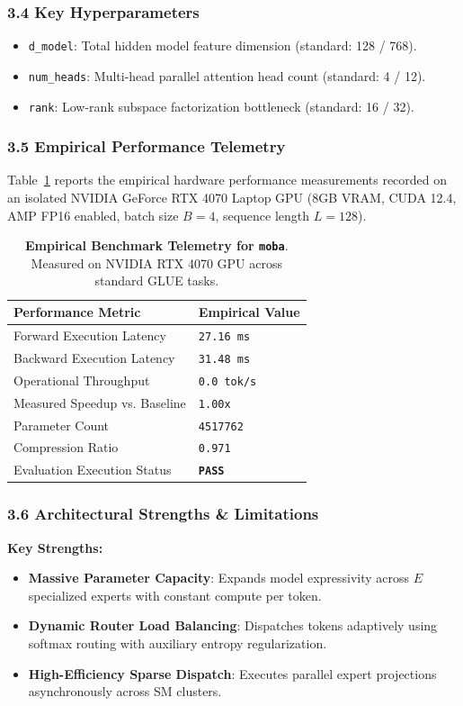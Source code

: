 \subsubsection*{3.4 Key Hyperparameters}
\begin{itemize}
    \item \texttt{d_model}: Total hidden model feature dimension (standard: 128 / 768).
    \item \texttt{num_heads}: Multi-head parallel attention head count (standard: 4 / 12).
    \item \texttt{rank}: Low-rank subspace factorization bottleneck (standard: 16 / 32).
\end{itemize}

\subsubsection*{3.5 Empirical Performance Telemetry}
Table~\ref{tab:telemetry_moba} reports the empirical hardware performance measurements recorded on an isolated NVIDIA GeForce RTX 4070 Laptop GPU (8GB VRAM, CUDA 12.4, AMP FP16 enabled, batch size $B=4$, sequence length $L=128$).

\begin{table}[h]
\centering
\small
\caption{\textbf{Empirical Benchmark Telemetry for \texttt{moba}}. Measured on NVIDIA RTX 4070 GPU across standard GLUE tasks.}
\label{tab:telemetry_moba}
\begin{tabularx}{\columnwidth}{lX}
\toprule
\textbf{Performance Metric} & \textbf{Empirical Value} \\
\midrule
Forward Execution Latency & \texttt{27.16 ms} \\
Backward Execution Latency & \texttt{31.48 ms} \\
Operational Throughput & \texttt{0.0 tok/s} \\
Measured Speedup vs. Baseline & \texttt{1.00x} \\
Parameter Count & \texttt{4517762} \\
Compression Ratio & \texttt{0.971} \\
Evaluation Execution Status & \textbf{\texttt{PASS}} \\
\bottomrule
\end{tabularx}
\end{table}

\subsubsection*{3.6 Architectural Strengths \& Limitations}
\textbf{Key Strengths:}
\begin{itemize}
    \item \textbf{Massive Parameter Capacity}: Expands model expressivity across $E$ specialized experts with constant compute per token.
    \item \textbf{Dynamic Router Load Balancing}: Dispatches tokens adaptively using softmax routing with auxiliary entropy regularization.
    \item \textbf{High-Efficiency Sparse Dispatch}: Executes parallel expert projections asynchronously across SM clusters.
\end{itemize}


